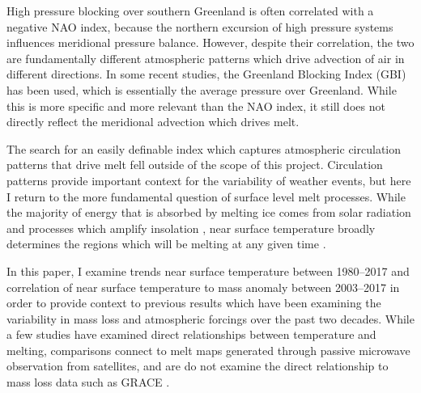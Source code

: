 \documentclass[11pt]{report}
\begin{document}
High pressure blocking over southern Greenland is often correlated with a negative NAO index, because the northern excursion of high pressure systems influences meridional pressure balance. However, despite their correlation, the two are fundamentally different atmospheric patterns which drive advection of air in different directions. In some recent studies, the Greenland Blocking Index (GBI) has been used, which is essentially the average pressure over Greenland. While this is more specific and more relevant than the NAO index, it still does not directly reflect the meridional advection which drives melt.

The search for an easily definable index which captures atmospheric circulation patterns that drive melt fell outside of the scope of this project. Circulation patterns provide important context for the variability of weather events, but here I return to the more fundamental question of surface level melt processes. While the majority of energy that is absorbed by melting ice comes from solar radiation and processes which amplify insolation \cite[][]{mattingly2018, solomon2017,angelen2014}, near surface temperature broadly determines the regions which will be melting at any given time \cite[][]{broeke2011}. 

In this paper, I examine trends near surface temperature between 1980--2017 and correlation of near surface temperature to mass anomaly between 2003--2017 in order to provide context to previous results which have been examining the variability in mass loss and atmospheric forcings over the past two decades. While a few studies have examined direct relationships between temperature and melting, comparisons connect to melt maps generated through passive microwave observation from satellites, and are do not examine the direct relationship to mass loss data such as GRACE \cite[][]{cullather2018,valisuo2018}.



 
 



\end{document}
